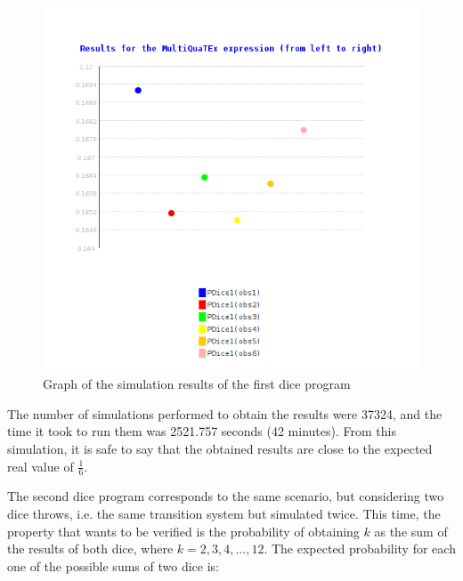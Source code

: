 \begin{figure}[H]
    \centering
    \includegraphics[scale = 0.5]{images/CS2.png}
    \caption{Graph of the simulation results of the first dice program}
    \label{fig:ce2}
\end{figure}
The number of simulations performed to obtain the results were 37324, and the time it took to run them was 2521.757 seconds (42 minutes). From this simulation, it is safe to say that the obtained results are close to the expected real value of $\frac{1}{6}$.

The second dice program corresponds to the same scenario, but considering two dice throws, i.e. the same transition system but simulated twice. This time, the property that wants to be verified is the probability of obtaining $k$ as the sum of the results of both dice, where $k = 2,3,4,...,12$. The expected probability for each one of the possible sums of two dice is:

